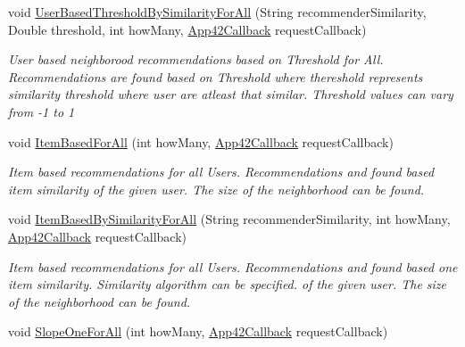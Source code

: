 \begin{DoxyCompactItemize}
void \hyperlink{classcom_1_1shephertz_1_1app42_1_1paas_1_1sdk_1_1windows_1_1recommend_1_1_recommender_service_ae18acfdcb07949b2ffcd04b1d77f5eab}{User\+Based\+Threshold\+By\+Similarity\+For\+All} (String recommender\+Similarity, Double threshold, int how\+Many, \hyperlink{interfacecom_1_1shephertz_1_1app42_1_1paas_1_1sdk_1_1windows_1_1_app42_callback}{App42\+Callback} request\+Callback)
\begin{DoxyCompactList}\small\item\em User based neighborood recommendations based on Threshold for All. Recommendations are found based on Threshold where thereshold represents similarity threshold where user are atleast that similar. Threshold values can vary from -\/1 to 1 \end{DoxyCompactList}\item 
void \hyperlink{classcom_1_1shephertz_1_1app42_1_1paas_1_1sdk_1_1windows_1_1recommend_1_1_recommender_service_ac3572bfedc9ed6b3342fc065efa3e35b}{Item\+Based\+For\+All} (int how\+Many, \hyperlink{interfacecom_1_1shephertz_1_1app42_1_1paas_1_1sdk_1_1windows_1_1_app42_callback}{App42\+Callback} request\+Callback)
\begin{DoxyCompactList}\small\item\em Item based recommendations for all Users. Recommendations and found based item similarity of the given user. The size of the neighborhood can be found. \end{DoxyCompactList}\item 
void \hyperlink{classcom_1_1shephertz_1_1app42_1_1paas_1_1sdk_1_1windows_1_1recommend_1_1_recommender_service_af96a4510b80a1296cf450bbf2d52dd6a}{Item\+Based\+By\+Similarity\+For\+All} (String recommender\+Similarity, int how\+Many, \hyperlink{interfacecom_1_1shephertz_1_1app42_1_1paas_1_1sdk_1_1windows_1_1_app42_callback}{App42\+Callback} request\+Callback)
\begin{DoxyCompactList}\small\item\em Item based recommendations for all Users. Recommendations and found based one item similarity. Similarity algorithm can be specified. of the given user. The size of the neighborhood can be found. \end{DoxyCompactList}\item 
void \hyperlink{classcom_1_1shephertz_1_1app42_1_1paas_1_1sdk_1_1windows_1_1recommend_1_1_recommender_service_a6d9712ba15a3089ea216206bbf725362}{Slope\+One\+For\+All} (int how\+Many, \hyperlink{interfacecom_1_1shephertz_1_1app42_1_1paas_1_1sdk_1_1windows_1_1_app42_callback}{App42\+Callback} request\+Callback)

\end{DoxyCompactItemize}

